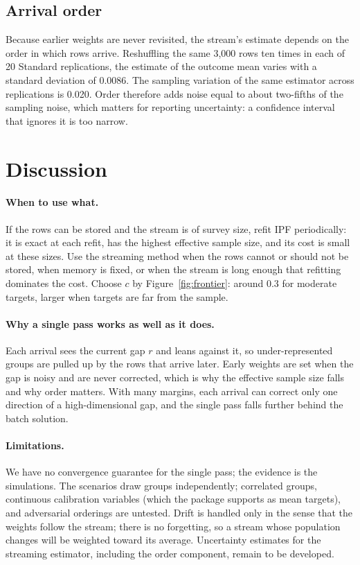 \documentclass[12pt, letterpaper]{article}
\begin{document}
\subsection{Arrival order}

Because earlier weights are never revisited, the stream's estimate depends on the order in which rows arrive. Reshuffling the same 3,000 rows ten times in each of 20 Standard replications, the estimate of the outcome mean varies with a standard deviation of 0.0086. The sampling variation of the same estimator across replications is 0.020. Order therefore adds noise equal to about two-fifths of the sampling noise, which matters for reporting uncertainty: a confidence interval that ignores it is too narrow.

\section{Discussion}
\label{sec:discussion}

\paragraph{When to use what.} If the rows can be stored and the stream is of survey size, refit IPF periodically: it is exact at each refit, has the highest effective sample size, and its cost is small at these sizes. Use the streaming method when the rows cannot or should not be stored, when memory is fixed, or when the stream is long enough that refitting dominates the cost. Choose $c$ by Figure~\ref{fig:frontier}: around 0.3 for moderate targets, larger when targets are far from the sample.

\paragraph{Why a single pass works as well as it does.} Each arrival sees the current gap $r$ and leans against it, so under-represented groups are pulled up by the rows that arrive later. Early weights are set when the gap is noisy and are never corrected, which is why the effective sample size falls and why order matters. With many margins, each arrival can correct only one direction of a high-dimensional gap, and the single pass falls further behind the batch solution.

\paragraph{Limitations.} We have no convergence guarantee for the single pass; the evidence is the simulations. The scenarios draw groups independently; correlated groups, continuous calibration variables (which the package supports as mean targets), and adversarial orderings are untested. Drift is handled only in the sense that the weights follow the stream; there is no forgetting, so a stream whose population changes will be weighted toward its average. Uncertainty estimates for the streaming estimator, including the order component, remain to be developed.
\end{document}
